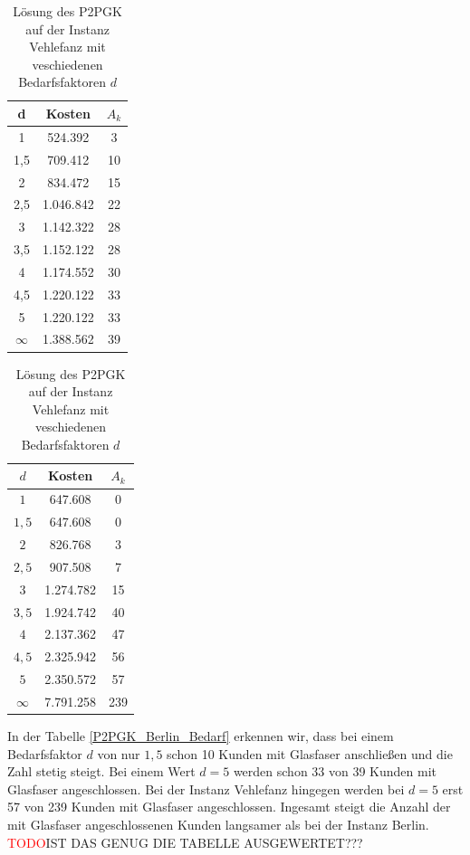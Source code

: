 \documentclass[11pt,a4paper]{article}
\newcommand{\TODO}{\textcolor{red}{TODO}}
\theoremstyle{my_th_style1}
\begin{document}
\begin{table}[h]
	\centering
	\begin{minipage}{.35\textwidth}
			\centering
	\begin{tabular}{c|c|c}
		\centering
		d& Kosten & $A_k$ \\	
		\hline
		1& 524.392 & 3 \\
		1,5 & 709.412 & 10 \\
		2 & 834.472 & 15 \\
		2,5 & 1.046.842 & 22 \\
		3 & 1.142.322 & 28 \\
		3,5 & 1.152.122 & 28 \\
		4 & 1.174.552 & 30 \\
		4,5 & 1.220.122 & 33 \\	
		5 & 1.220.122 & 33 \\
		$\infty$ &  1.388.562 & 39 \\
	\end{tabular}
	\label{P2PGK_Berlin_Bedarf}
	\caption{Lösung des P2PGK auf der Instanz Berlin mit veschiedenen Bedarfsfaktoren}
	\end{minipage}
	\hspace{0.5cm}
	\begin{minipage}{0.35\textwidth}
			\centering
		\begin{tabular}{c|c|c}
			\centering
			$d$ & Kosten & $A_k$ \\	
			\hline
			$1$   &   647.608 & 0  \\
			$1,5$ &   647.608 & 0  \\
			$2$   &   826.768 & 3  \\
			$2,5$ &   907.508 & 7  \\
			$3$   & 1.274.782 & 15 \\
			$3,5$ & 1.924.742 & 40 \\
			$4$   & 2.137.362 & 47 \\
			$4,5$ & 2.325.942 & 56 \\
			$5$   & 2.350.572 & 57 \\
			$\infty$ & 7.791.258 & 239 \\ 
		\end{tabular}
		\label{P2PGK_Vehlefanz_Bedarf}
	\caption{Lösung des P2PGK auf der Instanz Vehlefanz mit veschiedenen Bedarfsfaktoren $d$}
	\end{minipage}
\end{table}
\vspace{0.5cm}
In der Tabelle \ref{P2PGK_Berlin_Bedarf} erkennen wir, dass bei einem Bedarfsfaktor $d$ von nur $1,5$ schon 10 Kunden mit Glasfaser anschließen und die Zahl stetig steigt. Bei einem Wert $d=5$ werden schon 33 von 39 Kunden mit Glasfaser angeschlossen.
Bei der Instanz Vehlefanz hingegen werden bei $d=5$ erst 57 von 239 Kunden mit Glasfaser angeschlossen. Ingesamt steigt die Anzahl der mit Glasfaser angeschlossenen Kunden langsamer als bei der Instanz Berlin.
\TODO IST DAS GENUG DIE TABELLE AUSGEWERTET???
\end{document}
